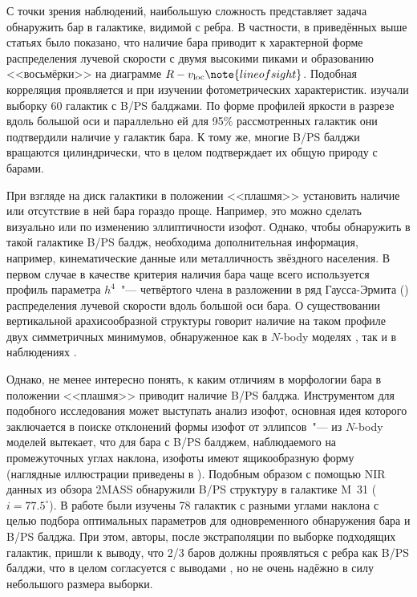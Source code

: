 \documentclass{trlnotes}
\begin{document}
С точки зрения наблюдений,
наибольшую сложность представляет задача обнаружить бар в галактике, видимой с ребра. В частности, в приведённых выше статьях
было показано, что наличие бара приводит к характерной форме
распределения лучевой скорости с двумя высокими пиками и образованию
<<восьмёрки>> на диаграмме $R - v_{\text{loc}}\note{line of sight}$. 
Подобная корреляция проявляется и при изучении фотометрических характеристик. \citet{lutticke2000a} изучали выборку 60 галактик с B/PS балджами. По форме
профилей яркости в разрезе вдоль большой оси и параллельно ей для 95\% рассмотренных галактик они  подтвердили наличие у галактик бара. 
К тому же, многие B/PS балджи вращаются цилиндрически, что в целом подтверждает их общую природу с барами. 
 
При взгляде на диск галактики в положении <<плашмя>> установить наличие или отсутствие в ней бара гораздо проще. Например, это можно сделать визуально или по изменению эллиптичности изофот. Однако, чтобы обнаружить в такой галактике B/PS балдж, необходима дополнительная информация, например, кинематические данные или металличность звёздного населения. В первом случае в качестве критерия наличия бара чаще всего используется профиль параметра
$h^4$~"---  четвёртого члена в разложении в ряд Гаусса-Эрмита (\cite{vandermarel1993}) распределения лучевой
скорости вдоль большой оси бара. 
О существовании вертикальной арахисообразной структуры говорит наличие на таком профиле двух симметричных минимумов, обнаруженное как в $N$-body моделях \citep{debattista2005,iannuzzi2015}, так и в наблюдениях \citep{mendez-abreu2008}.

Однако, не менее интересно понять, к каким отличиям в морфологии бара в положении  <<плашмя>> приводит наличие B/PS балджа. 
Инструментом для подобного исследования может выступать анализ изофот, основная идея которого заключается в поиске
отклонений формы изофот от эллипсов~"--- из $N$-body моделей вытекает, что для бара с B/PS балджем,
наблюдаемого на промежуточных углах наклона, изофоты имеют
ящикообразную форму (наглядные иллюстрации приведены в
\cite{erwin2016}). Подобным образом с помощью NIR данных из обзора 2MASS  \citet{beaton2007} обнаружили B/PS структуру в галактике M~31 ($i = 77.5^\circ$). В работе \citet{erwin2013} были изучены 78 галактик с разными углами наклона с целью подбора оптимальных параметров для
одновременного обнаружения бара и B/PS балджа. При этом, авторы, после экстраполяции по выборке
подходящих галактик, пришли к выводу, что 2/3 баров должны проявляться с ребра как B/PS балджи, что в
целом согласуется с выводами \citet{lutticke2000a}, но не очень надёжно в силу небольшого размера выборки.
\end{document}

